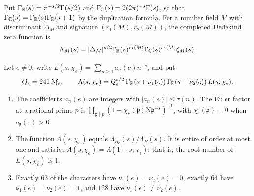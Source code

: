 Put $\Gamma_\mathbb R(s)=\pi^{-s/2}\Gamma(s/2)$ and
$\Gamma_\mathbb C(s)=2(2\pi)^{-s}\Gamma(s)$, so that
$\Gamma_\mathbb C(s)=\Gamma_\mathbb R(s)\Gamma_\mathbb R(s+1)$ by the duplication formula. For a
number field $M$ with discriminant $\Delta_M$ and signature
$(r_1(M),r_2(M))$, the completed Dedekind zeta function is
\[
 \Lambda_M(s)=|\Delta_M|^{s/2}\Gamma_\mathbb R(s)^{r_1(M)}\Gamma_\mathbb C(s)^{r_2(M)}
 \zeta_M(s).
\]

\begin{proposition}\label{gf:degree-two}
Let $e\ne0$, write $L(s,\chi_e)=\sum_{n\ge1}a_n(e)n^{-s}$, and put
\[
 Q_e=241\,\mathrm N\mathfrak f_e,\qquad
 \Lambda(s,\chi_e)=Q_e^{s/2}\,\Gamma_\mathbb R(s+\nu_1(e))\,\Gamma_\mathbb R(s+\nu_2(e))\,
 L(s,\chi_e).
\]
\begin{enumerate}
\item The coefficients $a_n(e)$ are integers with $|a_n(e)|\le\tau(n)$. The
 Euler factor at a rational prime $p$ is
 $\prod_{\mathfrak p\mid p}(1-\chi_e(\mathfrak p)\mathrm N\mathfrak p^{-s})^{-1}$,
 with $\chi_e(\mathfrak p)=0$ when $c_{\mathfrak p}(e)>0$.
\item The function $\Lambda(s,\chi_e)$ equals $\Lambda_{B_e}(s)/\Lambda_B(s)$.
 It is entire of order at most one and satisfies
 $\Lambda(s,\chi_e)=\Lambda(1-s,\chi_e)$; that is, the root number of
 $L(s,\chi_e)$ is $1$.
\item Exactly $63$ of the characters have $\nu_1(e)=\nu_2(e)=0$, exactly
 $64$ have $\nu_1(e)=\nu_2(e)=1$, and $128$ have $\nu_1(e)\ne\nu_2(e)$.
\end{enumerate}
\end{proposition}

